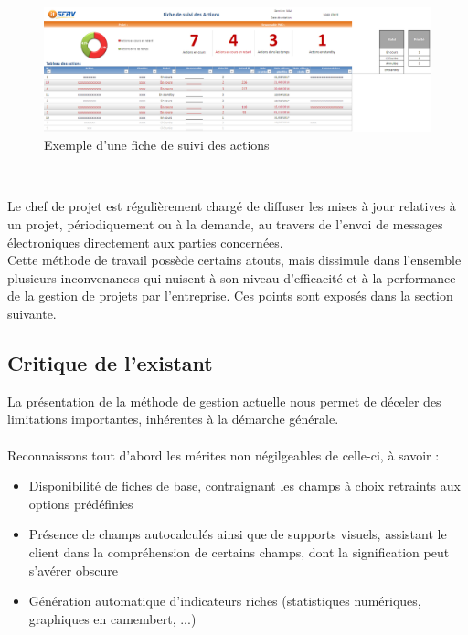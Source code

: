 \begin{spacing}{1.5}
\begin{figure}[H]
\centering
\includegraphics[width=\linewidth]{ficheActions.png}
\caption{Exemple d'une fiche de suivi des actions}
\label{fig:actionFiche}
\end{figure}
\

Le chef de projet est régulièrement chargé de diffuser les mises à jour relatives à un projet, périodiquement ou à la demande, au travers de l'envoi de messages électroniques directement aux parties concernées.\\

Cette méthode de travail possède certains atouts, mais dissimule dans l'ensemble plusieurs inconvenances qui nuisent à son niveau d'efficacité et à la performance de la gestion de projets par l'entreprise. Ces points sont exposés dans la section suivante.

\subsection{Critique de l'existant}
La présentation de la méthode de gestion actuelle nous permet de déceler des limitations importantes, inhérentes à la démarche générale.\\
\\
Reconnaissons tout d'abord les mérites non négilgeables de celle-ci, à savoir :
\begin{itemize}
    \item Disponibilité de fiches de base, contraignant les champs à choix retraints aux options prédéfinies
    \item Présence de champs autocalculés ainsi que de supports visuels, assistant le client dans la compréhension de certains champs, dont la signification peut s'avérer obscure
    \item Génération automatique d'indicateurs riches (statistiques numériques, graphiques en camembert, ...)
\end{itemize}
\


\end{spacing}
